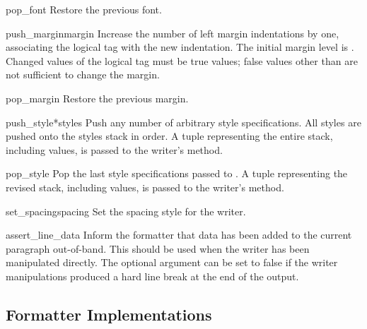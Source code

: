 \begin{methoddesc}[formatter]{pop_font}{}
Restore the previous font.
\end{methoddesc}

\begin{methoddesc}[formatter]{push_margin}{margin}
Increase the number of left margin indentations by one, associating
the logical tag  with the new indentation.  The initial
margin level is .  Changed values of the logical tag must be
true values; false values other than  are not
sufficient to change the margin.
\end{methoddesc}

\begin{methoddesc}[formatter]{pop_margin}{}
Restore the previous margin.
\end{methoddesc}

\begin{methoddesc}[formatter]{push_style}{*styles}
Push any number of arbitrary style specifications.  All styles are
pushed onto the styles stack in order.  A tuple representing the
entire stack, including  values, is passed to the
writer's  method.
\end{methoddesc}

\begin{methoddesc}[formatter]{pop_style}{}
Pop the last  style specifications passed to
.  A tuple representing the revised stack,
including  values, is passed to the writer's
 method.
\end{methoddesc}

\begin{methoddesc}[formatter]{set_spacing}{spacing}
Set the spacing style for the writer.
\end{methoddesc}

\begin{methoddesc}[formatter]{assert_line_data}{}
Inform the formatter that data has been added to the current paragraph
out-of-band.  This should be used when the writer has been manipulated
directly.  The optional  argument can be set to false if
the writer manipulations produced a hard line break at the end of the
output.
\end{methoddesc}


\subsection{Formatter Implementations \label{formatter-impls}}

